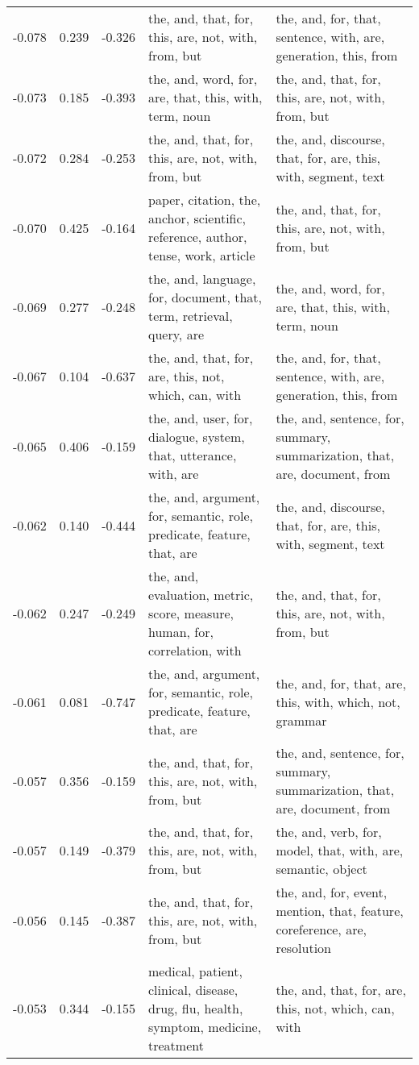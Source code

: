 \begin{tabular}{cccp{5cm}p{5cm}}
-0.078 & 0.239 & -0.326 & the, and, that, for, this, are, not, with, from, but & the, and, for, that, sentence, with, are, generation, this, from \\
-0.073 & 0.185 & -0.393 & the, and, word, for, are, that, this, with, term, noun & the, and, that, for, this, are, not, with, from, but \\
-0.072 & 0.284 & -0.253 & the, and, that, for, this, are, not, with, from, but & the, and, discourse, that, for, are, this, with, segment, text \\
-0.070 & 0.425 & -0.164 & paper, citation, the, anchor, scientific, reference, author, tense, work, article & the, and, that, for, this, are, not, with, from, but \\
-0.069 & 0.277 & -0.248 & the, and, language, for, document, that, term, retrieval, query, are & the, and, word, for, are, that, this, with, term, noun \\
-0.067 & 0.104 & -0.637 & the, and, that, for, are, this, not, which, can, with & the, and, for, that, sentence, with, are, generation, this, from \\
-0.065 & 0.406 & -0.159 & the, and, user, for, dialogue, system, that, utterance, with, are & the, and, sentence, for, summary, summarization, that, are, document, from \\
-0.062 & 0.140 & -0.444 & the, and, argument, for, semantic, role, predicate, feature, that, are & the, and, discourse, that, for, are, this, with, segment, text \\
-0.062 & 0.247 & -0.249 & the, and, evaluation, metric, score, measure, human, for, correlation, with & the, and, that, for, this, are, not, with, from, but \\
-0.061 & 0.081 & -0.747 & the, and, argument, for, semantic, role, predicate, feature, that, are & the, and, for, that, are, this, with, which, not, grammar \\
-0.057 & 0.356 & -0.159 & the, and, that, for, this, are, not, with, from, but & the, and, sentence, for, summary, summarization, that, are, document, from \\
-0.057 & 0.149 & -0.379 & the, and, that, for, this, are, not, with, from, but & the, and, verb, for, model, that, with, are, semantic, object \\
-0.056 & 0.145 & -0.387 & the, and, that, for, this, are, not, with, from, but & the, and, for, event, mention, that, feature, coreference, are, resolution \\
-0.053 & 0.344 & -0.155 & medical, patient, clinical, disease, drug, flu, health, symptom, medicine, treatment & the, and, that, for, are, this, not, which, can, with \\

\end{tabular}
